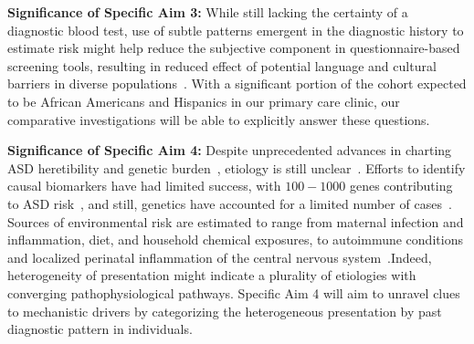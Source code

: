\documentclass[onecolumn, compsoc,11pt]{IEEEtran}
\begin{document}
\textbf{Significance of Specific Aim 3:} While still lacking the certainty of a diagnostic blood test,  use of subtle patterns emergent in  the diagnostic history to estimate risk might help reduce the subjective component in questionnaire-based screening tools, resulting in reduced effect of potential language and cultural barriers in diverse populations~\cite{hyman2020identification}. With a significant portion of the  cohort expected to be African Americans and Hispanics in our primary care clinic, our comparative investigations will be able to explicitly answer these questions.

\textbf{Significance of Specific Aim 4:} 
Despite unprecedented  advances in charting ASD heretibility and  genetic burden~\cite{Satterstrom484113,sandin17}, etiology  is still unclear~\cite{pmid29691724,pmid29307081}.
Efforts to  identify  causal biomarkers  have had limited success, with $100-1000$ genes contributing to ASD risk~\cite{pmid26402605,pmid25038753,Satterstrom484113,pmid27891212}, and still, genetics have accounted for a limited number of cases~\cite{pmid18414403}. Sources of environmental  risk are estimated to range from maternal infection and inflammation, diet, and  household chemical exposures,  to autoimmune conditions and localized perinatal  inflammation of the central nervous system~\cite{pmid30971960,pmid30941018,pmid29691724,pmid29307081,pmid27351598,pmid26793298,pmid30095240,pmid25681541}.Indeed, heterogeneity of presentation might indicate a plurality of   etiologies with converging pathophysiological pathways. Specific Aim 4 will aim to unravel clues to mechanistic drivers by  categorizing the heterogeneous presentation by past diagnostic pattern in individuals.




\end{document}
